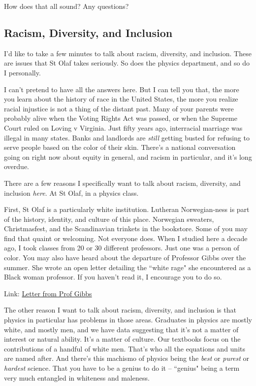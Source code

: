 \documentclass[10pt]{article}
\begin{document}
How does that all sound? Any questions?

\subsection*{Racism, Diversity, and Inclusion}

I'd like to take a few minutes to talk about racism, diversity, and inclusion. These are issues that St Olaf takes seriously. So does the physics department, and so do I personally. 
    
I can't pretend to have all the answers here. But I can tell you that, the more you learn about the history of race in the United States, the more you realize racial injustice is not a thing of the distant past. Many of your parents were probably alive when the Voting Rights Act was passed, or when the Supreme Court ruled on Loving v Virginia. Just fifty years ago, interracial marriage was illegal in many states. Banks and landlords are \textit{still} getting busted for refusing to serve people based on the color of their skin. There's a national conversation going on right now about equity in general, and racism in particular, and it's long overdue. 

There are a few reasons I specifically want to talk about racism, diversity, and inclusion \textit{here}. At St Olaf, in a physics class. 

First, St Olaf is a particularly white institution. Lutheran Norwegian-ness is part of the history, identity, and culture of this place. Norwegian sweaters, Christmasfest, and the Scandinavian trinkets in the bookstore. Some of you may find that quaint or welcoming. Not everyone does. When I studied here a decade ago, I took classes from 20 or 30 different professors. Just one was a person of color. You may also have heard about the departure of Professor Gibbs over the summer. She wrote an open letter detailing the ``white rage" she encountered as a Black woman professor. If you haven't read it, I encourage you to do so. 

Link: \href{https://www.theolafmessenger.com/2020/former-professor-michelle-gibbs-implicates-ole-culture-in-letter-following-resignation-sparks-discussion-of-anti-racist-action-on-campus/}{Letter from Prof Gibbs}
    
The other reason I want to talk about racism, diversity, and inclusion is that physics in particular has problems in those areas. Graduates in physics are mostly white, and mostly men, and we have data suggesting that it's not a matter of interest or natural ability. It's a matter of culture. Our textbooks focus on the contributions of a handful of white men. That's who all the equations and units are named after. And there's this machismo of physics being the \textit{best} or \textit{purest} or \textit{hardest} science. That you have to be a genius to do it -- ``genius" being a term very much entangled in whiteness and maleness. 
\end{document}
